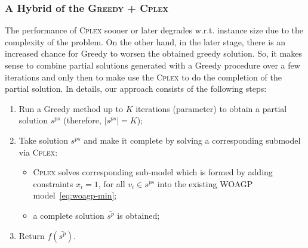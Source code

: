 \documentclass[runningheads,a4paper]{elsarticle}
\begin{document}
\subsubsection{A Hybrid of the \textsc{Greedy + \textsc{Cplex}}}
	The performance of \textsc{Cplex}  sooner or later degrades w.r.t. instance size due to the complexity of the problem. On the other hand, in the later stage, there is an increased chance for Greedy to worsen the obtained greedy solution. So, it makes sense to combine  partial solutions generated with a Greedy procedure over a few iterations  and only then to make use the \textsc{Cplex} to do the completion of the partial solution. In details, our approach consists of the following steps:
	\begin{enumerate}
		\item Run a Greedy method up to $K$ iterations (parameter) to obtain a partial solution $s^{ps}$ (therefore, $|s^{ps}| = K$);
		\item Take solution $s^{ps}$ and make it complete by solving a corresponding submodel via \textsc{Cplex}:
		\begin{itemize}
			\item \textsc{Cplex} solves corresponding sub-model which is formed by adding constraints $x_{i} = 1$, for all $v_i \in s^{ps}$ into the existing WOAGP model~\ref{eq:woagp-min};
			\item a complete solution $\bar {s^p}$ is obtained;
		\end{itemize}
		\item Return $f(\bar {s^p})$.
	\end{enumerate}

	
\end{document}
